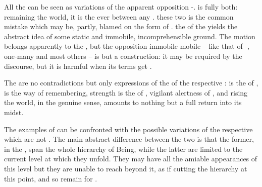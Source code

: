  All the  can be seen as
variations of the apparent opposition -.
 is fully both: remaining   the world, it is
the  ever  between any . 
these two  is the common mistake which may be, partly, blamed on the
 form of .   the
 of the  yields the abstract idea of some static
and immobile, incomprehensible ground.   The motion belongs apparently to the , but the opposition immobile-mobile -- like that of
-, one-many and most others -- is but a
construction: it may be required by the  discourse, but it is harmful
when its terms get .

The  are no contradictions but only  expressions
of the  of the respective :  is the 
of ,  is the way of remembering, strength is the
 of , vigilant alertness of , and rising
 the world, in the genuine sense, amounts to nothing but a full return
into its midst. 



\label{sub:examples}
The examples of  can be confronted with the possible
variations of the respective  which are not . The main abstract difference between the two is that the former,
 in the , span the whole hierarchy of Being,
while the latter are limited to the current level at which they unfold. They may
have all the amiable appearances of this level but they are unable to reach
beyond it, as if cutting the hierarchy at this point, and so remain 
for .


